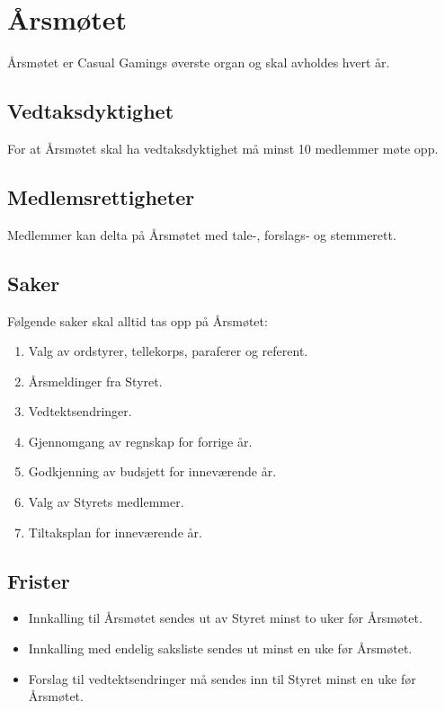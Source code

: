 \chapter{Årsmøtet}
Årsmøtet er Casual Gamings øverste organ og skal avholdes hvert år.

\section{Vedtaksdyktighet}
For at Årsmøtet skal ha vedtaksdyktighet må minst 10 medlemmer møte opp.

\section{Medlemsrettigheter}
Medlemmer kan delta på Årsmøtet med tale-, forslags‐ og stemmerett.

\section{Saker}
Følgende saker skal alltid tas opp på Årsmøtet:
\begin{enumerate}
    \item Valg av ordstyrer, tellekorps, paraferer og referent.
    \item Årsmeldinger fra Styret.
    \item Vedtektsendringer.
    \item Gjennomgang av regnskap for forrige år.
    \item Godkjenning av budsjett for inneværende år.
    \item Valg av Styrets medlemmer.
    \item Tiltaksplan for inneværende år.
\end{enumerate}

\section{Frister}
\begin{itemize}
    \item Innkalling til Årsmøtet sendes ut av Styret minst to uker før Årsmøtet.
    \item Innkalling med endelig saksliste sendes ut minst en uke før Årsmøtet.
    \item Forslag til vedtektsendringer må sendes inn til Styret minst en uke før Årsmøtet.
\end{itemize}

